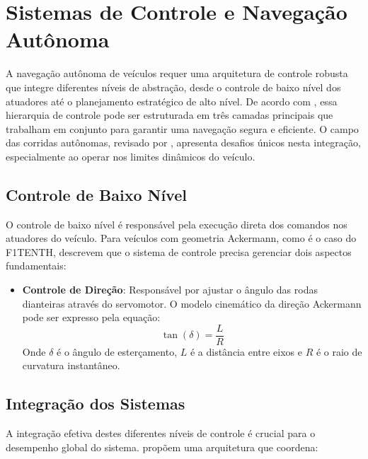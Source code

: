 \section{Sistemas de Controle e Navegação Autônoma}

A navegação autônoma de veículos requer uma arquitetura de controle robusta que
integre diferentes níveis de abstração, desde o controle de baixo nível dos
atuadores até o planejamento estratégico de alto nível. De acordo com
\cite{Wang2020LMPC}, essa hierarquia de controle pode ser estruturada em três
camadas principais que trabalham em conjunto para garantir uma navegação segura
e eficiente. O campo das corridas autônomas, revisado por
\cite{Betz2022Survey}, apresenta desafios únicos nesta integração,
especialmente ao operar nos limites dinâmicos do veículo.

\subsection{Controle de Baixo Nível}

O controle de baixo nível é responsável pela execução direta dos comandos nos
atuadores do veículo. Para veículos com geometria Ackermann, como é o caso do
F1TENTH, \cite{Babu2020Simulator} descrevem que o sistema de controle precisa
gerenciar dois aspectos fundamentais:

\begin{itemize}
    \item \textbf{Controle de Direção}: Responsável por ajustar o ângulo das rodas dianteiras através do servomotor. O modelo cinemático da direção Ackermann pode ser expresso pela equação:
          \begin{equation}
              \tan(\delta) = \frac{L}{R}
              \label{eq:ackermann_steering}
          \end{equation}
          Onde $\delta$ é o ângulo de esterçamento, $L$ é a distância entre eixos e $R$ é o raio de curvatura instantâneo.
\end{itemize}

\subsection{Integração dos Sistemas}

A integração efetiva destes diferentes níveis de controle é crucial para o
desempenho global do sistema. \cite{OKelly2020F1TENTH} propõem uma arquitetura
que coordena:


